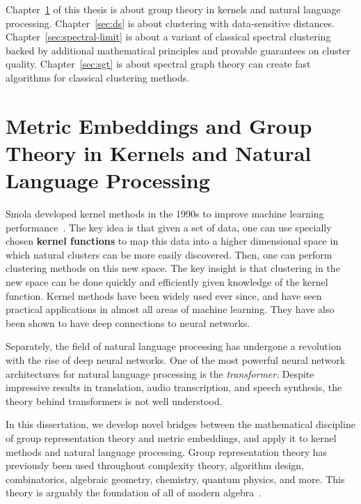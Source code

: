 Chapter~\ref{sec:group} of this thesis is about group theory in kernels and natural language
processing. Chapter~\ref{sec:ds} is about clustering with
data-sensitive distances. Chapter~\ref{sec:spectral-limit} is about
a variant of classical spectral clustering
backed by additional mathematical principles and provable guarantees on
cluster quality. Chapter~\ref{sec:sgt} is about spectral graph
theory can create fast algorithms for classical clustering methods.

\section{Metric Embeddings and Group Theory in Kernels and Natural Language
  Processing}\label{sec:group}
  Smola developed kernel methods in the 1990s to improve machine
  learning performance~\cite{s96}. The key idea is that given a set of data, one
  can use specially chosen \textbf{kernel functions} to map this data into a higher dimensional space in
  which natural clusters can be more easily discovered. Then, one can perform clustering
  methods on this new space. The key insight is that clustering in the
  new space can be done quickly and efficiently given knowledge of the
  kernel function. Kernel methods have been widely used ever since, and
  have seen practical applications in almost all areas of machine
  learning. They have also been shown to have deep connections to
  neural networks.

  Separately, the field of natural language processing has undergone a
  revolution with the rise of deep neural networks. One of the most
  powerful neural network architectures for natural language processing is the
  \textit{transformer}. Despite impressive
  results in translation, audio transcription, and
  speech synthesis, the theory behind transformers is not well understood. 

  In this dissertation, we develop novel bridges between the
  mathematical discipline of group representation theory and metric
  embeddings, and apply it
  to kernel methods and natural language processing.  Group
  representation theory has previously been used throughout complexity theory, algorithm design,
  combinatorics, algebraic geometry, chemistry, quantum physics, and
  more. This theory is arguably the foundation of all of modern
  algebra~\cite{FH91, etingof}.

